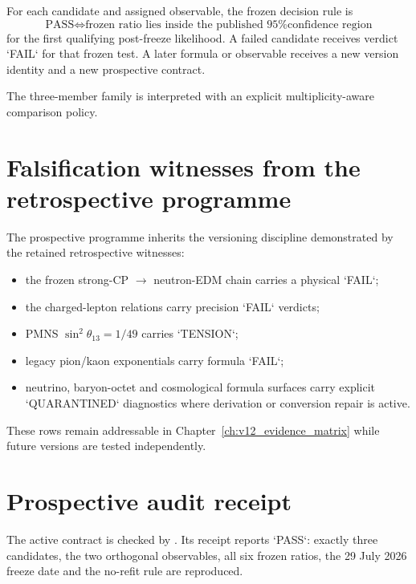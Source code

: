 \documentclass[11pt,a4paper,twoside]{book}
\theoremstyle{definition}
\begin{document}
For each candidate and assigned observable, the frozen decision rule is
\begin{equation}
\boxed{
\text{PASS}
\iff
\text{frozen ratio lies inside the published 95\% confidence region}
}
\end{equation}
for the first qualifying post-freeze likelihood. A failed candidate receives verdict `FAIL` for that frozen test. A later formula or observable receives a new version identity and a new prospective contract.

The three-member family is interpreted with an explicit multiplicity-aware comparison policy.

\section{Falsification witnesses from the retrospective programme}

The prospective programme inherits the versioning discipline demonstrated by the retained retrospective witnesses:
\begin{itemize}
\item the frozen strong-CP $\to$ neutron-EDM chain carries a physical `FAIL`;
\item the charged-lepton relations carry precision `FAIL` verdicts;
\item PMNS $\sin^2\theta_{13}=1/49$ carries `TENSION`;
\item legacy pion/kaon exponentials carry formula `FAIL`;
\item neutrino, baryon-octet and cosmological formula surfaces carry explicit `QUARANTINED` diagnostics where derivation or conversion repair is active.
\end{itemize}
These rows remain addressable in Chapter~\ref{ch:v12_evidence_matrix} while future versions are tested independently.

\section{Prospective audit receipt}

The active contract is checked by
.
Its receipt
reports `PASS`: exactly three candidates, the two orthogonal observables, all six frozen ratios, the 29 July 2026 freeze date and the no-refit rule are reproduced.

\clearpage
\end{document}
